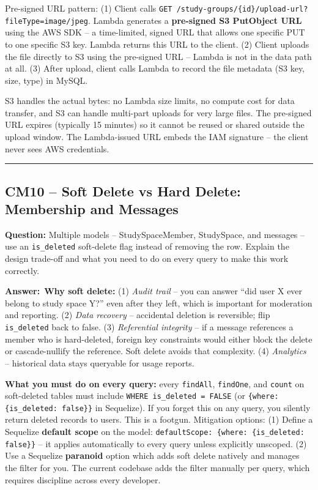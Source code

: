 \documentclass[letterpaper,10pt]{article}
\newlength{\boxwidth}
\newcommand{\questionbox}[1]{%
  \vspace{6pt}%
  \noindent\colorbox{qbg}{%
    \begin{minipage}{\boxwidth}%
      \vspace{3pt}\textbf{\textcolor{nordblue}{Question:}} #1\vspace{3pt}%
    \end{minipage}%
  }\vspace{2pt}%
}
\newcommand{\answerlabel}{\noindent\textbf{\textcolor{answerblue}{Answer:}}~}
\begin{document}
Pre-signed URL pattern: (1) Client calls \texttt{GET /study-groups/\{id\}/upload-url?fileType=image/jpeg}. Lambda generates a \textbf{pre-signed S3 PutObject URL} using the AWS SDK -- a time-limited, signed URL that allows one specific PUT to one specific S3 key. Lambda returns this URL to the client. (2) Client uploads the file directly to S3 using the pre-signed URL -- Lambda is not in the data path at all. (3) After upload, client calls Lambda to record the file metadata (S3 key, size, type) in MySQL.

S3 handles the actual bytes: no Lambda size limits, no compute cost for data transfer, and S3 can handle multi-part uploads for very large files. The pre-signed URL expires (typically 15 minutes) so it cannot be reused or shared outside the upload window. The Lambda-issued URL embeds the IAM signature -- the client never sees AWS credentials.

\medskip\rule{\linewidth}{0.2pt}

\subsection*{CM10 -- Soft Delete vs Hard Delete: Membership and Messages}

\questionbox{Multiple models -- StudySpaceMember, StudySpace, and messages -- use an \texttt{is\_deleted} soft-delete flag instead of removing the row. Explain the design trade-off and what you need to do on every query to make this work correctly.}

\answerlabel \textbf{Why soft delete:} (1) \textit{Audit trail} -- you can answer ``did user X ever belong to study space Y?'' even after they left, which is important for moderation and reporting. (2) \textit{Data recovery} -- accidental deletion is reversible; flip \texttt{is\_deleted} back to false. (3) \textit{Referential integrity} -- if a message references a member who is hard-deleted, foreign key constraints would either block the delete or cascade-nullify the reference. Soft delete avoids that complexity. (4) \textit{Analytics} -- historical data stays queryable for usage reports.

\textbf{What you must do on every query:} every \texttt{findAll}, \texttt{findOne}, and \texttt{count} on soft-deleted tables must include \texttt{WHERE is\_deleted = FALSE} (or \texttt{\{where: \{is\_deleted: false\}\}} in Sequelize). If you forget this on any query, you silently return deleted records to users. This is a footgun. Mitigation options: (1) Define a Sequelize \textbf{default scope} on the model: \texttt{defaultScope: \{where: \{is\_deleted: false\}\}} -- it applies automatically to every query unless explicitly unscoped. (2) Use a Sequelize \textbf{paranoid} option which adds soft delete natively and manages the filter for you. The current codebase adds the filter manually per query, which requires discipline across every developer.
\end{document}
